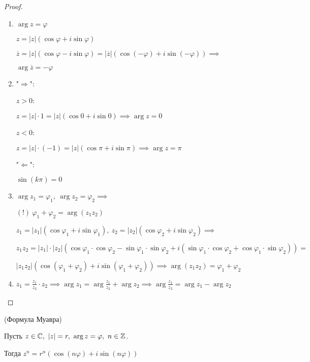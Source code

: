 \begin{proof}
    \begin{enumerate}
        \item $\arg z = \varphi$
        
        $z = |z|(\cos\varphi + i\sin\varphi)$
        
        $\overline{z} = |z|(\cos\varphi - i\sin\varphi) = |\overline{z}|(\cos(-\varphi) + i\sin(-\varphi)) \implies$
        
        $\arg \overline{z} = -\varphi$

        \item "$\Rightarrow$":
        
        $z > 0$: 
        
        $z = |z| \cdot 1 = |z|(\cos 0 + i\sin 0) \implies \arg z = 0$
        
        $z < 0$: 
        
        $z = |z| \cdot (-1) = |z|(\cos \pi + i\sin \pi) \implies \arg z = \pi$
        
        "$\Leftarrow$":
        
        $\sin(k \pi) = 0$

        \item $\arg z_1 = \varphi_1,~\arg z_2 = \varphi_2 \implies$
        
        $(!)~\varphi_1 + \varphi_2 = \arg(z_1 z_2)$
        
        $z_1 = |z_1|(\cos\varphi_1 + i\sin\varphi_1),~z_2 = |z_2|(\cos\varphi_2 + i\sin\varphi_2) \implies$
        
        $z_1 z_2 = |z_1| \cdot |z_2|(\cos\varphi_1 \cdot \cos\varphi_2 - \sin\varphi_1 \cdot \sin\varphi_2 + i(\sin\varphi_1 \cdot \cos\varphi_2 + \cos\varphi_1 \cdot \sin\varphi_2)) =$
        
        $|z_1 z_2|(\cos(\varphi_1 + \varphi_2) + i\sin(\varphi_1 + \varphi_2)) \implies \arg(z_1 z_2) = \varphi_1 + \varphi_2$

        \item $z_1 = \frac{z_1}{z_2} \cdot z_2 \implies \arg z_1 = \arg \frac{z_1}{z_2} + \arg z_2 \implies \arg \frac{z_1}{z_2} = \arg z_1 - \arg z_2$

    \end{enumerate}
\end{proof}

\begin{follow}(Формула Муавра)

    Пусть $z \in \mathbb{C},~|z| = r,~\arg z = \varphi,~n \in \mathbb{Z}$.

    Тогда $z^n = r^n(\cos(n\varphi) + i\sin(n\varphi))$
\end{follow}

